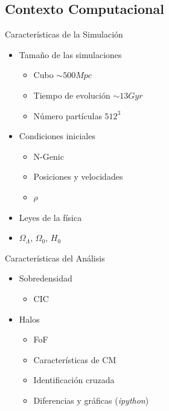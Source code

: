 \documentclass{beamer}
\begin{document}
\subsection{Contexto Computacional}
\begin{frame}{Características de la Simulación}
	\begin{itemize}
		\item Tamaño de las simulaciones
		\begin{itemize}
			\item Cubo $\sim 500Mpc$
			\item Tiempo de evolución $\sim 13 Gyr$
			\item Número partículas $512^3$
		\end{itemize}
		\item Condiciones iniciales
		\begin{itemize}
			\item N-Genic
			\item Posiciones y velocidades
			\item $\rho$
		\end{itemize}
		\item Leyes de la física
		\item $\Omega_\Lambda$, $\Omega_0$, $H_0$
	\end{itemize}
		
\end{frame}
\begin{frame}{Características del Análisis}
	\begin{block}{}
	\begin{itemize}
		\item Sobredensidad
		\begin{itemize}
			\item CIC
		\end{itemize}
		\item Halos
		\begin{itemize}
			\item FoF
			\item Características de CM
			\item Identificación cruzada
			\item Diferencias y gráficas (\textit{ipython})
		\end{itemize}
	\end{itemize}
	\end{block}	
\end{frame}
\end{document}
